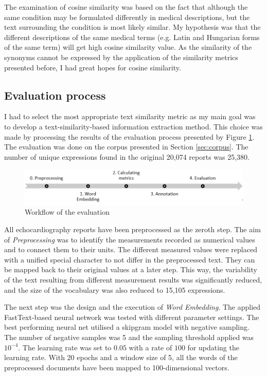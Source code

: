 The examination of cosine similarity was based on the fact that although the same condition may be formulated differently in medical descriptions, but the text surrounding the condition is most likely similar. My hypothesis was that the different descriptions of the same medical terms (e.g. Latin and Hungarian forms of the same term) will get high cosine similarity value. As the similarity of the synonyms cannot be expressed by the application of the similarity metrics presented before, I had great hopes for cosine similarity.

\subsection{Evaluation process}
\label{sec:eval_tm}

I had to select the most appropriate text similarity metric as my main goal was to develop a text-similarity-based information extraction method. This choice was made by processing the results of the evaluation process presented by Figure \ref{fig:evaluation_workflow}. The evaluation was done on the corpus presented in Section \ref{sec:corpus}. The number of unique expressions found in the original 20,074 reports was 25,380. 

\begin{figure}[h]
	\centering
        \captionsetup{justification=centering}
	\includegraphics[width=\textwidth]{assets/figures/text_mining/measures/workflow.png}
	\caption{Workflow of the evaluation}
	\label{fig:evaluation_workflow}
\end{figure}

All echocardiography reports have been preprocessed as the zeroth step. The aim of \textit{Preprocessing} was to identify the measurements recorded as numerical values and to connect them to their units. The different measured values were replaced with a unified special character to not differ in the preprocessed text. They can be mapped back to their original values at a later step. This way, the variability of the text resulting from different measurement results was significantly reduced, and the size of the vocabulary was also reduced to 15,105 expressions.

The next step was the design and the execution of \textit{Word Embedding}. The applied FastText-based neural network was tested with different parameter settings. The best performing neural net utilised a skipgram model with negative sampling. The number of negative samples was 5 and the sampling threshold applied was $10^{-4}$. The learning rate was set to $0.05$ with a rate of $100$ for updating the learning rate. With 20 epochs and a window size of 5, all the words of the preprocessed documents have been mapped to 100-dimensional vectors.


